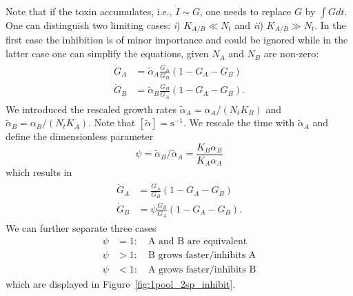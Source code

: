 \documentclass[10pt,A4paper]{article}
\numberwithin{equation}{section}
\begin{document}
Note that if the toxin accumulates, i.e., $\dot I \sim G$,  one needs to replace $G$ by $\int G dt$.
One can distinguish two limiting cases: {\it i}) $K_{A/B}\ll N_t$ and {\it ii}) $K_{A/B}\gg N_t$.
In the first case the inhibition is of minor importance and could be ignored while in the latter case one can simplify the equations, given $N_A$ and $N_B$ are non-zero:
\begin{align}\begin{split}
    \dot{G}_A &=\tilde{\alpha}_A\frac{G_A}{G_B}\left(1 - G_A-G_B\right)\\
    \dot{G}_B &= \tilde{\alpha}_B\frac{G_B}{G_A}\left(1 - G_A-G_B\right).
\end{split}\end{align}
We introduced the rescaled growth rates $\tilde{\alpha}_A=\alpha_A/(N_tK_B)$ and $\tilde{\alpha}_B=\alpha_B/(N_tK_A)$.
Note that $[\tilde{\alpha}]=\mathrm{s}^{-1}$.
We rescale the time with $\tilde{\alpha}_A$ and define the dimensionless parameter
\begin{equation}
    \psi = \tilde{\alpha}_B/\tilde{\alpha}_A = \frac{K_B\alpha_B}{K_A\alpha_A}
\end{equation}
which results in
\begin{align}
    \begin{split}
        \dot{G}_A &=\frac{G_A}{G_B}\left(1 - G_A-G_B\right)\\
        \dot{G}_B &=\psi\frac{G_B}{G_A}\left(1-G_A-G_B\right). 
    \end{split}
\label{eq:2sp_1pool_inhibit_unitless}
\end{align}
We can further separate three cases
\begin{align}
    \psi&=1:\quad\text{A and B are equivalent}\\
    \psi&>1:\quad\text{B grows faster/inhibits A}\\
    \psi&<1:\quad\text{A grows faster/inhibits B}
\end{align}
which are displayed in Figure~\ref{fig:1pool_2sp_inhibit}.
%
\end{document}
